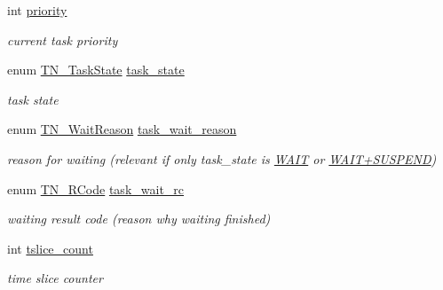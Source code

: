 \begin{DoxyCompactItemize}
int \hyperlink{structTN__Task_a43c9c73249da8faa1177587786c40616}{priority}
\begin{DoxyCompactList}\small\item\em current task priority \end{DoxyCompactList}\item 
\mbox{\label{structTN__Task_a6a1ec466a27d43d68f21a62e2c6cf03d}} 
enum \hyperlink{tn__tasks_8h_a5e12e8a0ab280b515f44bf3fee1210a6}{T\+N\+\_\+\+Task\+State} \hyperlink{structTN__Task_a6a1ec466a27d43d68f21a62e2c6cf03d}{task\+\_\+state}
\begin{DoxyCompactList}\small\item\em task state \end{DoxyCompactList}\item 
\mbox{\label{structTN__Task_a37d3c12db92b7dfc6c3bb661216f3c11}} 
enum \hyperlink{tn__tasks_8h_a343b0332013c15d6e878c2f60ed2c9b7}{T\+N\+\_\+\+Wait\+Reason} \hyperlink{structTN__Task_a37d3c12db92b7dfc6c3bb661216f3c11}{task\+\_\+wait\+\_\+reason}
\begin{DoxyCompactList}\small\item\em reason for waiting (relevant if only {\ttfamily task\+\_\+state} is \hyperlink{tn__tasks_8h_a5e12e8a0ab280b515f44bf3fee1210a6aaa3dfaf2bb5992e0cef981618ce30d56}{{\ttfamily W\+A\+IT}} or \hyperlink{tn__tasks_8h_a5e12e8a0ab280b515f44bf3fee1210a6ad010070ccc16a5c706c286baf2e3ee2a}{{\ttfamily W\+A\+I\+T+\+S\+U\+S\+P\+E\+ND}}) \end{DoxyCompactList}\item 
\mbox{\label{structTN__Task_a367b92b74248f8702ed428a695079903}} 
enum \hyperlink{tn__common_8h_aa43bd3da1ad4c1e61224b5f23b369876}{T\+N\+\_\+\+R\+Code} \hyperlink{structTN__Task_a367b92b74248f8702ed428a695079903}{task\+\_\+wait\+\_\+rc}
\begin{DoxyCompactList}\small\item\em waiting result code (reason why waiting finished) \end{DoxyCompactList}\item 
\mbox{\label{structTN__Task_ab3ca332d577071de47d85fb1371f6830}} 
int \hyperlink{structTN__Task_ab3ca332d577071de47d85fb1371f6830}{tslice\+\_\+count}
\begin{DoxyCompactList}\small\item\em time slice counter \end{DoxyCompactList}\item 

\end{DoxyCompactItemize}
